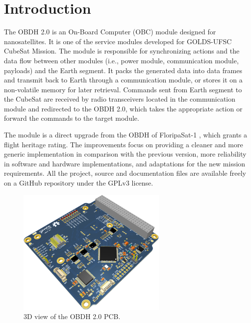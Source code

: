 %
%
%
%
%

%
%
%
%
%
%

\chapter{Introduction} \label{ch:introduction}

The OBDH 2.0 is an On-Board Computer (OBC) module designed for nanosatellites. It is one of the service modules developed for GOLDS-UFSC CubeSat Mission. The module is responsible for synchronizing actions and the data flow between other modules (i.e., power module, communication module, payloads) and the Earth segment. It packs the generated data into data frames and transmit back to Earth through a communication module, or stores it on a non-volatile memory for later retrieval. Commands sent from Earth segment to the CubeSat are received by radio transceivers located in the communication module and redirected to the OBDH 2.0, which takes the appropriate action or forward the commands to the target module.

The module is a direct upgrade from the OBDH of FloripaSat-1 \cite{obdh-fsat}, which grants a flight heritage rating. The improvements focus on providing a cleaner and more generic implementation in comparison with the previous version, more reliability in software and hardware implementations, and adaptations for the new mission requirements. All the project, source and documentation files are available freely on a GitHub repository \cite{obdh2-repo} under the GPLv3 license.


\begin{figure}[!ht]
    \begin{center}
        \includegraphics[width=0.65\textwidth]{figures/obdh2-pcb-3d.png}
        \caption{3D view of the OBDH 2.0 PCB.}
        \label{fig:pcb-3d}
    \end{center}
\end{figure}
